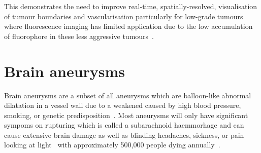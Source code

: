 This demonstrates the need to improve real-time, spatially-resolved, visualisation of tumour boundaries and vascularisation particularly for low-grade tumours where fluorescence imaging has limited application due to the low accumulation of fluorophore in these less aggressive tumours~\cite{Belykh2023, Kiesel2021, Jaber2019}. 

\section{Brain aneurysms}
Brain aneurysms are a subset of all aneurysms which are balloon-like abnormal dilatation in a vessel wall due to a weakened caused by high blood pressure, smoking, or genetic predisposition~\cite{NationalHealthService2022}. Most aneurysms will only have significant sympoms on rupturing which is called a subarachnoid haemmorhage and can cause extensive brain damage as well as blinding headaches, sickness, or pain looking at light~\cite{NationalHealthService2022} with approximately 500,000 people dying annually~\cite{Toth2018}. 

